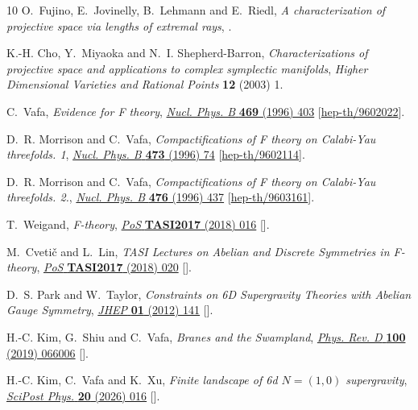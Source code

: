 \documentclass[11pt]{amsart}
\theoremstyle{definition}
\theoremstyle{definition}
\theoremstyle{remark}
\theoremstyle{remark}
\theoremstyle{definition}
\theoremstyle{conjecture}
\begin{document}
\begin{thebibliography}{10}
O.~Fujino, E.~Jovinelly, B.~Lehmann and E.~Riedl, \emph{A characterization of
  projective space via lengths of extremal rays},
  \href{https://arxiv.org/abs/2602.22192}{{}}.

K.-H. Cho, Y.~Miyaoka and N.~I. Shepherd-Barron, \emph{Characterizations of
  projective space and applications to complex symplectic manifolds},
  {\emph{Higher Dimensional Varieties and Rational Points} {\bfseries 12}
  (2003) 1}.

C.~Vafa, \emph{{Evidence for F theory}},
  \href{https://doi.org/10.1016/0550-3213(96)00172-1}{\emph{Nucl. Phys. B}
  {\bfseries 469} (1996) 403}
  [\href{https://arxiv.org/abs/hep-th/9602022}{{\ttfamily hep-th/9602022}}].

D.~R. Morrison and C.~Vafa, \emph{{Compactifications of F theory on Calabi-Yau
  threefolds. 1}},
  \href{https://doi.org/10.1016/0550-3213(96)00242-8}{\emph{Nucl. Phys. B}
  {\bfseries 473} (1996) 74}
  [\href{https://arxiv.org/abs/hep-th/9602114}{{\ttfamily hep-th/9602114}}].

D.~R. Morrison and C.~Vafa, \emph{{Compactifications of F theory on Calabi-Yau
  threefolds. 2.}},
  \href{https://doi.org/10.1016/0550-3213(96)00369-0}{\emph{Nucl. Phys. B}
  {\bfseries 476} (1996) 437}
  [\href{https://arxiv.org/abs/hep-th/9603161}{{\ttfamily hep-th/9603161}}].

T.~Weigand, \emph{{F-theory}},
  \href{https://doi.org/10.22323/1.305.0016}{\emph{PoS} {\bfseries TASI2017}
  (2018) 016} [\href{https://arxiv.org/abs/1806.01854}{{}}].

M.~Cveti{\v{c}} and L.~Lin, \emph{{TASI Lectures on Abelian and Discrete
  Symmetries in F-theory}},
  \href{https://doi.org/10.22323/1.305.0020}{\emph{PoS} {\bfseries TASI2017}
  (2018) 020} [\href{https://arxiv.org/abs/1809.00012}{{}}].

D.~S. Park and W.~Taylor, \emph{{Constraints on 6D Supergravity Theories with
  Abelian Gauge Symmetry}},
  \href{https://doi.org/10.1007/JHEP01(2012)141}{\emph{JHEP} {\bfseries 01}
  (2012) 141} [\href{https://arxiv.org/abs/1110.5916}{{}}].

H.-C. Kim, G.~Shiu and C.~Vafa, \emph{{Branes and the Swampland}},
  \href{https://doi.org/10.1103/PhysRevD.100.066006}{\emph{Phys. Rev. D}
  {\bfseries 100} (2019) 066006}
  [\href{https://arxiv.org/abs/1905.08261}{{}}].

H.-C. Kim, C.~Vafa and K.~Xu, \emph{Finite landscape of 6d {$N=(1,0)$}
  supergravity},
  \href{https://doi.org/10.21468/SciPostPhys.20.1.016}{\emph{SciPost Phys.}
  {\bfseries 20} (2026) 016}
  [\href{https://arxiv.org/abs/2411.19155}{{}}].

\end{thebibliography}\endgroup
\end{document}
